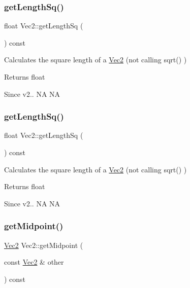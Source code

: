 \subsubsection{\texorpdfstring{get\+Length\+Sq()}{getLengthSq()}\hspace{0.1cm}{\footnotesize\ttfamily [1/2]}}
{\footnotesize\ttfamily float Vec2\+::get\+Length\+Sq (\begin{DoxyParamCaption}{ }\end{DoxyParamCaption}) const\hspace{0.3cm}{\ttfamily [inline]}}

Calculates the square length of a \hyperlink{classVec2}{Vec2} (not calling sqrt() ) \begin{DoxyReturn}{Returns}
float 
\end{DoxyReturn}
\begin{DoxySince}{Since}
v2..  NA  NA 
\end{DoxySince}
\mbox{\label{classVec2_a0b3f546ad8db551b9428d147318aee34}} 
\subsubsection{\texorpdfstring{get\+Length\+Sq()}{getLengthSq()}\hspace{0.1cm}{\footnotesize\ttfamily [2/2]}}
{\footnotesize\ttfamily float Vec2\+::get\+Length\+Sq (\begin{DoxyParamCaption}{ }\end{DoxyParamCaption}) const\hspace{0.3cm}{\ttfamily [inline]}}

Calculates the square length of a \hyperlink{classVec2}{Vec2} (not calling sqrt() ) \begin{DoxyReturn}{Returns}
float 
\end{DoxyReturn}
\begin{DoxySince}{Since}
v2..  NA  NA 
\end{DoxySince}
\mbox{\label{classVec2_ab4a3e36ded233d2b3b3f2a6a3ff9ca2c}} 
\subsubsection{\texorpdfstring{get\+Midpoint()}{getMidpoint()}\hspace{0.1cm}{\footnotesize\ttfamily [1/2]}}
{\footnotesize\ttfamily \hyperlink{classVec2}{Vec2} Vec2\+::get\+Midpoint (\begin{DoxyParamCaption}\item[{const \hyperlink{classVec2}{Vec2} \&}]{other }\end{DoxyParamCaption}) const\hspace{0.3cm}{\ttfamily [inline]}}

